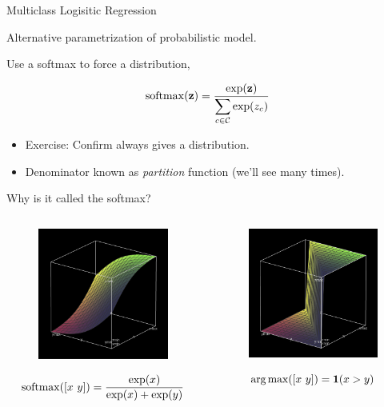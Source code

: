 \documentclass{beamer}
\begin{document}
\begin{frame}{Multiclass Logisitic Regression}

  Alternative parametrization of probabilistic model.

  
  Use a softmax to force a distribution,
  
  \[\softmax(\boldz) = \frac{\exp(\boldz)}{\displaystyle \sum_{c \in \mcC} \exp(z_c)}  \]

  \begin{itemize}
  \item Exercise: Confirm always gives a distribution.

  \item Denominator known as \textit{partition} function (we'll see many times).
  \end{itemize}

\end{frame}


\begin{frame}{Why is it called the softmax?}

  \begin{columns}[t]
    \begin{column}[t]{0.5\textwidth}


      \begin{figure}
        \centering
        \includegraphics[width=5cm]{softmax}
      \end{figure}
      \[\softmax([x\ y]) = \frac{\exp(x)}{\displaystyle  \exp(x) + \exp(y)}  \]
    \end{column}

    \begin{column}[t]{0.5\textwidth}


      \begin{figure}
        \centering
      \includegraphics[width=5cm]{argmax}
      \end{figure}
      \[\argmax([x\ y]) = \indicator(x > y) \]      
    \end{column}
  \end{columns}
\end{frame}
\end{document}
